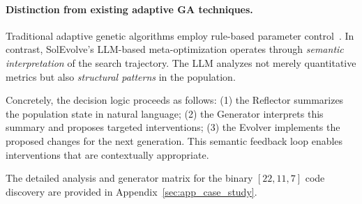 \paragraph{Distinction from existing adaptive GA techniques.} Traditional adaptive genetic algorithms employ rule-based parameter control~\cite{Eiben1999}. In contrast, SolEvolve's LLM-based meta-optimization operates through \textit{semantic interpretation} of the search trajectory. The LLM analyzes not merely quantitative metrics but also \textit{structural patterns} in the population.

Concretely, the decision logic proceeds as follows: (1) the Reflector summarizes the population state in natural language; (2) the Generator interprets this summary and proposes targeted interventions; (3) the Evolver implements the proposed changes for the next generation. This semantic feedback loop enables interventions that are contextually appropriate.

The detailed analysis and generator matrix for the binary $[22,11,7]$ code discovery are provided in Appendix~\ref{sec:app_case_study}.
